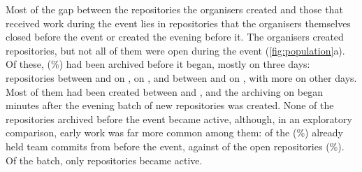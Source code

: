\documentclass{article}
\begin{document}
Most of the gap between the repositories the organisers created and those that received work during the event lies in repositories that the organisers themselves closed before the event or created the evening before it. The organisers created \NRqOneTotal{} repositories, but not all of them were open during the event (\cref{fig:population}a). Of these, \NRqOnePrearchivedN{} (\NRqOnePrearchivedPct\%) had been archived before it began, mostly on three days: \NRqOnePrearchivedClustersSepOneFiveN{} repositories between \NRqOnePrearchivedClustersSepOneFiveFirst{} and \NRqOnePrearchivedClustersSepOneFiveLast{} on \sepfifteen, \NRqOnePrearchivedClustersSepOneSevenN{} on \sepseventeen{}, and \NRqOnePrearchivedClustersSepTwoTwoN{} between \NRqOnePrearchivedClustersSepTwoTwoFirst{} and \NRqOnePrearchivedClustersSepTwoTwoLast{} on \batchday{}, with \NRqOnePrearchivedOther{} more on other days. Most of them had been created between \sepfifteen{} and \septwentyone{}, and the archiving on \batchday{} began minutes after the evening batch of \NRqOneBatchN{} new repositories was created. None of the repositories archived before the event became active, although, in an exploratory comparison, early work was far more common among them: \NRqOnePreEventCommitsPrearchivedN{} of the \NRqOnePreEventCommitsPrearchivedOf{} (\NRqOnePreEventCommitsPrearchivedPct\%) already held team commits from before the event, against \NRqOnePreEventCommitsOpenN{} of the \NRqOnePreEventCommitsOpenOf{} open repositories (\NRqOnePreEventCommitsOpenPct\%). Of the batch, only \NRqOneBatchActiveN{} repositories became active.
\end{document}

